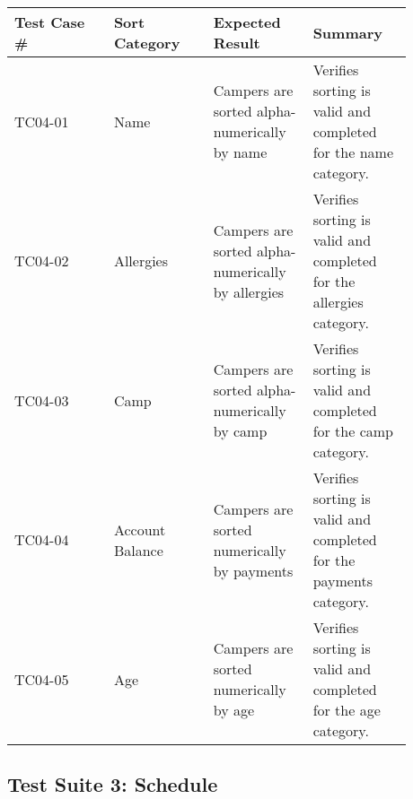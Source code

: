 \documentclass[11pt]{article}
\begin{document}
\begin{center}
\begin{longtable}{|p{0.22\linewidth}|p{0.22\linewidth}|p{0.22\linewidth}|p{0.22\linewidth}|}
	\hline
	Test Case \# & Sort Category & Expected Result & Summary\\\hline
	TC04-01 & Name & Campers are sorted alpha-numerically by name & Verifies sorting is valid and completed for the name category.\vspace*{1em}\\\hline
	TC04-02 & Allergies & Campers are sorted alpha-numerically by allergies & Verifies sorting is valid and completed for the allergies category.\vspace*{1em}\\	\hline
	TC04-03 & Camp & Campers are sorted alpha-numerically by camp & Verifies sorting is valid and completed for the camp category.\vspace*{1em}\\\hline
	TC04-04 & Account Balance & Campers are sorted numerically by payments & Verifies sorting is valid and completed for the payments category.\vspace*{1em}\\\hline
	TC04-05 & Age & Campers are sorted numerically by age & Verifies sorting is valid and completed for the age category.\vspace*{1em}\\\hline
\end{longtable}
\end{center}
\clearpage


\subsection*{Test Suite 3: Schedule}
\end{document}
